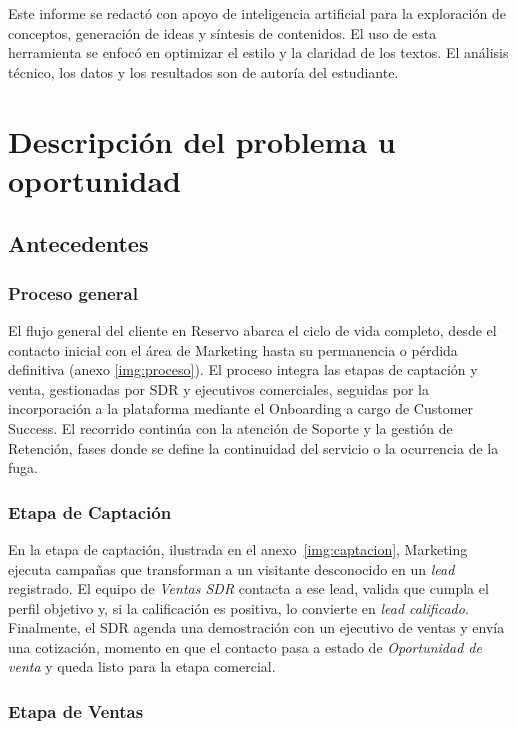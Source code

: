 Este informe se redactó con apoyo de inteligencia artificial para la exploración de conceptos, generación de ideas y síntesis de contenidos. El uso de esta herramienta se enfocó en optimizar el estilo y la claridad de los textos. El análisis técnico, los datos y los resultados son de autoría del estudiante.

\section{Descripción del problema u oportunidad}

\subsection{Antecedentes}

\subsubsection{Proceso general}


El flujo general del cliente en Reservo abarca el ciclo de vida completo, desde el contacto inicial con el área de Marketing hasta su permanencia o pérdida definitiva (anexo \ref{img:proceso}). El proceso integra las etapas de captación y venta, gestionadas por SDR y ejecutivos comerciales, seguidas por la incorporación a la plataforma mediante el Onboarding a cargo de Customer Success. El recorrido continúa con la atención de Soporte y la gestión de Retención, fases donde se define la continuidad del servicio o la ocurrencia de la fuga.

\subsubsection{Etapa de Captación}

En la etapa de captación, ilustrada en el anexo~\ref{img:captacion}, Marketing ejecuta campañas que transforman a un visitante desconocido en un \textit{lead} registrado. El equipo de \textit{Ventas SDR} contacta a ese lead, valida que cumpla el perfil objetivo y, si la calificación es positiva, lo convierte en \textit{lead calificado}. Finalmente, el SDR agenda una demostración con un ejecutivo de ventas y envía una cotización, momento en que el contacto pasa a estado de \textit{Oportunidad de venta} y queda listo para la etapa comercial.

\subsubsection{Etapa de Ventas}

